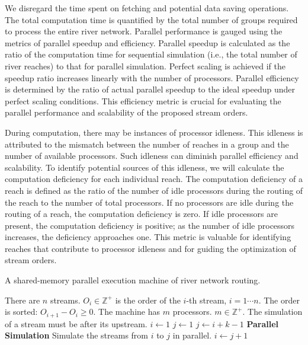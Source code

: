 \documentclass[water,article,submit,pdftex,moreauthors]{Definitions/mdpi}
\begin{document}
We disregard the time spent on fetching and potential data saving operations. The total computation time is quantified by the total number of groups required to process the entire river network. Parallel performance is gauged using the metrics of parallel speedup and efficiency. Parallel speedup is calculated as the ratio of the computation time for sequential simulation (i.e., the total number of river reaches) to that for parallel simulation. Perfect scaling is achieved if the speedup ratio increases linearly with the number of processors. Parallel efficiency is determined by the ratio of actual parallel speedup to the ideal speedup under perfect scaling conditions. This efficiency metric is crucial for evaluating the parallel performance and scalability of the proposed stream orders.

During computation, there may be instances of processor idleness. This idleness is attributed to the mismatch between the number of reaches in a group and the number of available processors. Such idleness can diminish parallel efficiency and scalability. To identify potential sources of this idleness, we will calculate the computation deficiency for each individual reach. The computation deficiency of a reach is defined as the ratio of the number of idle processors during the routing of the reach to the number of total processors. If no processors are idle during the routing of a reach, the computation deficiency is zero. If idle processors are present, the computation deficiency is positive; as the number of idle processors increases, the deficiency approaches one. This metric is valuable for identifying reaches that contribute to processor idleness and for guiding the optimization of stream orders.

\begin{algorithm}
    \caption{A shared-memory parallel execution machine of river network routing.}
    \label{alg:shared_memory}
    \begin{algorithmic}
        \REQUIRE There are $n$ streams. $O_i \in \mathbb{Z}^{+}$ is the order of the $i$-th stream, $i = 1\cdots{}n$. The order is sorted: $O_{i+1} - O_i \ge 0$.
        \REQUIRE The machine has $m$ processors. $m \in \mathbb{Z}^{+}$.
        \ENSURE The simulation of a stream must be after its upstream.
        \STATE $i \gets 1$ 
        \STATE $j \gets 1$ 
        \STATE $j \gets i + k - 1$
        \ENDIF
        \ENDFOR
        \STATE \textbf{Parallel Simulation} Simulate the streams from $i$ to $j$ in parallel.
        \STATE $i \gets j + 1$
        \ENDWHILE
    \end{algorithmic}
\end{algorithm}
\end{document}
